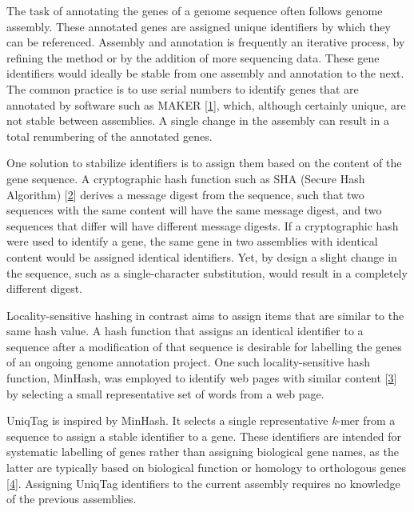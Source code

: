 \documentclass[10pt]{article}
\begin{document}
The task of annotating the genes of a genome sequence often follows
genome assembly. These annotated genes are assigned unique identifiers
by which they can be referenced. Assembly and annotation is frequently
an iterative process, by refining the method or by the addition of more
sequencing data. These gene identifiers would ideally be stable from one
assembly and annotation to the next. The common practice is to use
serial numbers to identify genes that are annotated by software such as
MAKER {[}\href{http://dx.doi.org/10.1104/pp.113.230144}{1}{]}, which,
although certainly unique, are not stable between assemblies. A single
change in the assembly can result in a total renumbering of the
annotated genes.

One solution to stabilize identifiers is to assign them based on the
content of the gene sequence. A cryptographic hash function such as SHA
(Secure Hash Algorithm)
{[}\href{http://www.nist.gov/manuscript-publication-search.cfm?pub_id=910977}{2}{]}
derives a message digest from the sequence, such that two sequences with
the same content will have the same message digest, and two sequences
that differ will have different message digests. If a cryptographic hash
were used to identify a gene, the same gene in two assemblies with
identical content would be assigned identical identifiers. Yet, by
design a slight change in the sequence, such as a single-character
substitution, would result in a completely different digest.

Locality-sensitive hashing in contrast aims to assign items that are
similar to the same hash value. A hash function that assigns an
identical identifier to a sequence after a modification of that sequence
is desirable for labelling the genes of an ongoing genome annotation
project. One such locality-sensitive hash function, MinHash, was
employed to identify web pages with similar content
{[}\href{http://dx.doi.org/10.1109/SEQUEN.1997.666900}{3}{]} by
selecting a small representative set of words from a web page.

UniqTag is inspired by MinHash. It selects a single representative
\emph{k}-mer from a sequence to assign a stable identifier to a gene.
These identifiers are intended for systematic labelling of genes rather
than assigning biological gene names, as the latter are typically based
on biological function or homology to orthologous genes
{[}\href{http://dx.doi.org/10.1006/geno.2002.6748}{4}{]}. Assigning
UniqTag identifiers to the current assembly requires no knowledge of the
previous assemblies.
\end{document}
